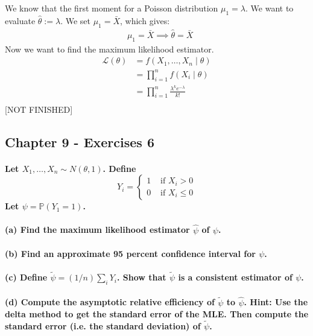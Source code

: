 \documentclass{article}
\renewcommand{\L}{\mathcal{L}}
\begin{document}
We know that the first moment for a Poisson distribution $\mu_1 = \lambda$. We want to evaluate \(\hat\theta := \lambda\).
We set \(\mu_1 = \bar{X}\), which gives:
\begin{align*}
     & \mu_1 = \bar{X}
    \implies
    \hat \theta = \bar{X}
\end{align*}
Now we want to find the maximum likelihood estimator.
\begin{align*}
    \L(\theta)
     & = f(X_1, \ldots, X_n \mid \theta) \\
     & = \prod_{i=1}^n f(X_i\mid \theta) \\
     & = \prod_{i=1}^n \frac{\lambda^k e^{-\lambda}}{k!} \\
\end{align*}
[NOT FINISHED]

\subsection{Chapter 9 - Exercises 6}
\paragraph{Let $X_{1}, \ldots, X_{n} \sim N(\theta, 1)$. Define
    $$
        Y_{i}=\left\{\begin{array}{ll}
            1 & \text { if } X_{i}>0      \\
            0 & \text { if } X_{i} \leq 0
        \end{array}\right.
    $$
    Let $\psi=\mathbb{P}\left(Y_{1}=1\right)$.}
\paragraph{(a) Find the maximum likelihood estimator $\widehat{\psi}$ of $\psi$.}
\paragraph{(b) Find an approximate 95 percent confidence interval for $\psi$.}
\paragraph{(c) Define $\widetilde{\psi}=(1 / n) \sum_{i} Y_{i}$. Show that $\widetilde{\psi}$ is a consistent estimator of $\psi$.}
\paragraph{(d) Compute the asymptotic relative efficiency of $\widetilde{\psi}$ to $\widehat{\psi}$. Hint: Use the delta method to get the standard error of the MLE. Then compute the standard error (i.e. the standard deviation) of $\widetilde{\psi}$.}
\end{document}
